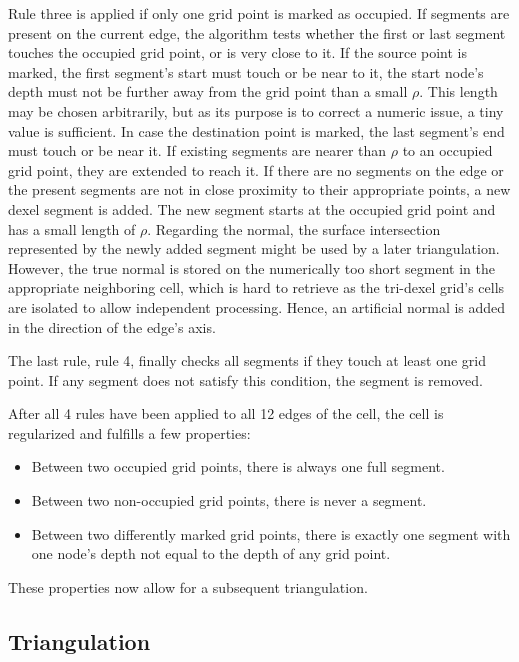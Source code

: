 Rule three is applied if only one grid point is marked as occupied.
If segments are present on the current edge, the algorithm tests whether the first or last segment touches the occupied grid point, or is very close to it.
If the source point is marked, the first segment's start must touch or be near to it, \ie the start node's depth must not be further away from the grid point than a small $\rho$.
This length may be chosen arbitrarily, but as its purpose is to correct a numeric issue, a tiny value is sufficient.
In case the destination point is marked, the last segment's end must touch or be near it.
If existing segments are nearer than $\rho$ to an occupied grid point, they are extended to reach it.
If there are no segments on the edge or the present segments are not in close proximity to their appropriate points, a new dexel segment is added.
The new segment starts at the occupied grid point and has a small length of $\rho$.
Regarding the normal, the surface intersection represented by the newly added segment might be used by a later triangulation.
However, the true normal is stored on the numerically too short segment in the appropriate neighboring cell, which is hard to retrieve as the tri-dexel grid's cells are isolated to allow independent processing.
Hence, an artificial normal is added in the direction of the edge's axis.

The last rule, rule 4, finally checks all segments if they touch at least one grid point.
If any segment does not satisfy this condition, the segment is removed.

After all 4 rules have been applied to all 12 edges of the cell, the cell is regularized and fulfills a few properties:
\begin{itemize}
	\item Between two occupied grid points, there is always one full segment.
	\item Between two non-occupied grid points, there is never a segment.
	\item Between two differently marked grid points, there is exactly one segment with one node's depth not equal to the depth of any grid point.
\end{itemize}
These properties now allow for a subsequent triangulation.


\subsection{Triangulation}
\label{sec:tri_dexel_triangulation}

